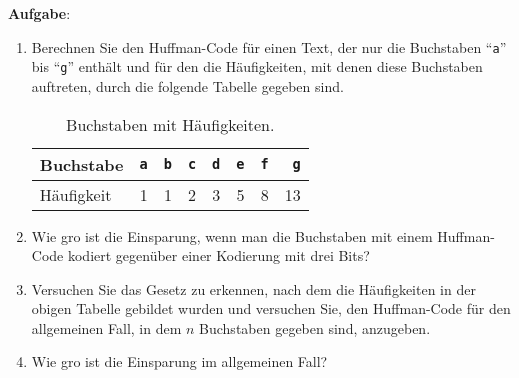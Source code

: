 \noindent
\textbf{Aufgabe}:
\begin{enumerate}
\item Berechnen Sie den Huffman-Code f\"ur einen Text, der nur die Buchstaben
      ``\texttt{a}'' bis ``\texttt{g}'' enth\"alt und f\"ur den die H\"aufigkeiten,
      mit denen diese Buchstaben auftreten, durch die folgende Tabelle gegeben sind.

\begin{table}[htbp]
  \centering
\begin{tabular}[t]{|l|r|r|r|r|r|r|r|}
\hline
Buchstabe  & \texttt{a} & \texttt{b} & \texttt{c} & \texttt{d} & \texttt{e} & \texttt{f} & \texttt{g} \\
\hline
H\"aufigkeit &          1 &          1 &          2 &          3 &          5 &         8 &         13 \\
\hline
\end{tabular}
  \caption{Buchstaben mit H\"aufigkeiten.}
  \label{tab:aufgabe-huffman}
\end{table}

\item Wie gro\3 ist die Einsparung, wenn man die Buchstaben mit einem Huffman-Code
      kodiert gegen\"uber einer Kodierung mit drei Bits?
\item Versuchen Sie das Gesetz zu erkennen, nach dem die H\"aufigkeiten in der obigen Tabelle 
      gebildet wurden und versuchen Sie, den Huffman-Code f\"ur den allgemeinen Fall,
      in dem $n$ Buchstaben gegeben sind, anzugeben.
\item Wie gro\3 ist die Einsparung im allgemeinen Fall?
\end{enumerate}

